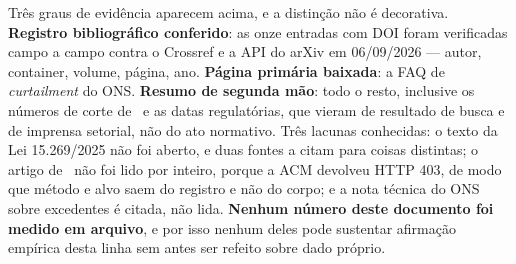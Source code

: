 \documentclass[10pt,a4paper,oneside]{book}
\begin{document}
\begin{objecao}
Três graus de evidência aparecem acima, e a distinção não é decorativa.
\textbf{Registro bibliográfico conferido}: as onze entradas com DOI foram
verificadas campo a campo contra o Crossref e a API do arXiv em 06/09/2026 ---
autor, container, volume, página, ano. \textbf{Página primária baixada}: a FAQ
de \emph{curtailment} do ONS. \textbf{Resumo de segunda mão}: todo o resto,
inclusive os números de corte de~\cite{canalsolar2026} e as datas regulatórias,
que vieram de resultado de busca e de imprensa setorial, não do ato normativo.
Três lacunas conhecidas: o texto da Lei 15.269/2025 não foi aberto, e duas
fontes a citam para coisas distintas; o artigo de~\cite{gorka2024} não foi lido
por inteiro, porque a ACM devolveu HTTP 403, de modo que método e alvo saem do
registro e não do corpo; e a nota técnica do ONS sobre excedentes é citada, não
lida. \textbf{Nenhum número deste documento foi medido em arquivo}, e por isso
nenhum deles pode sustentar afirmação empírica desta linha sem antes ser
refeito sobre dado próprio.
\end{objecao}
\end{document}
